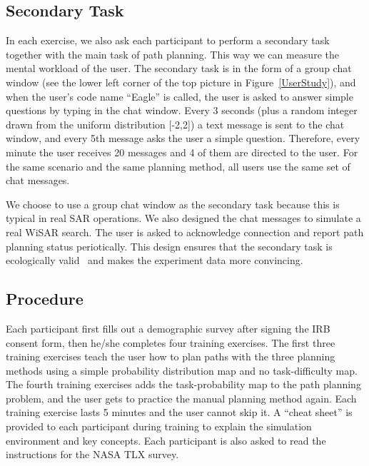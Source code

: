 \documentclass[journal]{IEEEtran}
\begin{document}
\subsection{Secondary Task}

In each exercise, we also ask each participant to perform a secondary task together with the main task of path planning. This way we can measure the mental workload of the user. The secondary task is in the form of a group chat window (see the lower left corner of the top picture in Figure~\ref{UserStudy}), and when the user's code name ``Eagle'' is called, the user is asked to answer simple questions by typing in the chat window. Every 3 seconds (plus a random integer drawn from the uniform distribution [-2,2]) a text message is sent to the chat window, and every 5th message asks the user a simple question. Therefore, every minute the user receives 20 messages and 4 of them are directed to the user. For the same scenario and the same planning method, all users use the same set of chat messages.

We choose to use a group chat window as the secondary task because this is typical in real SAR operations. We also designed the chat messages to simulate a real WiSAR search. The user is asked to acknowledge connection and report path planning status periotically. This design ensures that the secondary task is ecologically valid~\cite{Vicente1997Should,Rasmussen1994Cognitive} and makes the experiment data more convincing.

\subsection{Procedure}

Each participant first fills out a demographic survey after signing the IRB consent form, then he/she completes four training exercises. The first three training exercises teach the user how to plan paths with the three planning methods using a simple probability distribution map and no task-difficulty map. The fourth training exercises adds the task-probability map to the path planning problem, and the user gets to practice the manual planning method again. Each training exercise lasts 5 minutes and the user cannot skip it. A ``cheat sheet'' is provided to each participant during training to explain the simulation environment and key concepts. Each participant is also asked to read the instructions for the NASA TLX survey.
\end{document}
